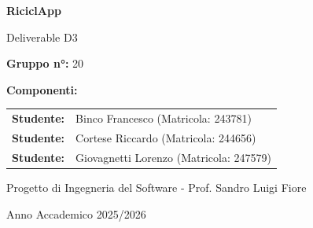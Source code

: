 \documentclass[12pt,a4paper]{article}
\begin{document}
\begin{titlepage}

    \centering
    \vspace*{2cm}
    {\Huge \textbf{RiciclApp} \par}
    \vspace{1cm}
    {\Large Deliverable D3 \par}
    \vspace{3cm}
    
    {\large \textbf{Gruppo n°:} 20 \par}
    \vspace{1.5cm}
    
    {\large \textbf{Componenti:} \par}
    \vspace{0.5cm}
    \begin{tabular}{rl}
        \textbf{Studente:} & Binco Francesco (Matricola: 243781) \\
        \textbf{Studente:} & Cortese Riccardo (Matricola: 244656) \\
        \textbf{Studente:} & Giovagnetti Lorenzo (Matricola: 247579) \\
    \end{tabular}
    
    \vfill
    {\large Progetto di Ingegneria del Software - Prof. Sandro Luigi Fiore \par}
    \vspace{1.5cm}
    {\large Anno Accademico 2025/2026 \par}
    \vspace{2cm}
\end{titlepage}


\begin{abstract}

Il presente progetto descrive l'ideazione e la progettazione di un sistema per l'ottimizzazione della raccolta differenziata urbana. 

L'obiettivo principale dell'applicazione è duplice: da un lato, semplificare il conferimento dei rifiuti per il cittadino attraverso strumenti di riconoscimento (scansione barcode) e localizzazione dei punti di raccolta con relativo stato di riempimento; dall'altro, fornire agli enti comunali e alle aziende di raccolta una visione d'insieme in tempo reale dello stato del territorio. 

Grazie ai dati trasmessi dai sensori IoT installati nei bidoni, l'amministratore può monitorare i livelli di riempimento, identificare le zone critiche e pianificare interventi di svuotamento mirati. Questo approccio permette di passare da una raccolta a calendario a una gestione dinamica "on-demand", riducendo i costi operativi e l'impatto ambientale dei mezzi di trasporto. 

Il sistema si avvale di una rete di sensori IoT installati nei bidoni stradali per il monitoraggio in tempo reale dei livelli di riempimento, permettendo agli operatori ecologici di usufruire di percorsi di raccolta ottimizzati. 
\end{abstract}
\end{document}

